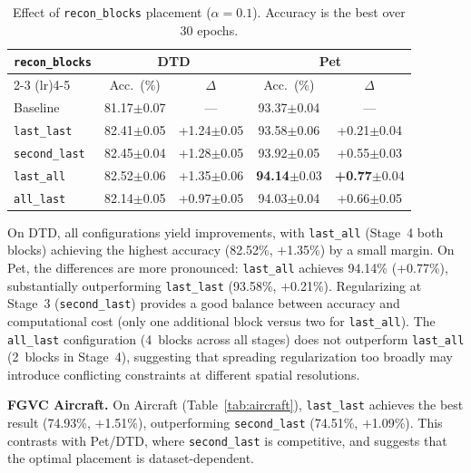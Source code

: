 \documentclass[review,12pt,authoryear]{elsarticle}
\newcommand{\std}[1]{{\scriptsize$\pm$#1}}
\begin{document}
\begin{table}[t]
\centering
\caption{Effect of \texttt{recon\_blocks} placement ($\alpha = 0.1$). Accuracy is the best over 30 epochs.}
\label{tab:blocks}
\small
\begin{tabular}{lcccc}
\toprule
\multirow{2}{*}{\texttt{recon\_blocks}} & \multicolumn{2}{c}{DTD} & \multicolumn{2}{c}{Pet} \\
\cmidrule(lr){2-3} \cmidrule(lr){4-5}
 & Acc.\ (\%) & $\Delta$ & Acc.\ (\%) & $\Delta$ \\
\midrule
Baseline       & 81.17\std{0.07} & ---   & 93.37\std{0.04} & ---   \\
\texttt{last\_last}    & 82.41\std{0.05} & +1.24\std{0.05} & 93.58\std{0.06} & +0.21\std{0.04} \\
\texttt{second\_last}  & 82.45\std{0.04} & +1.28\std{0.05} & 93.92\std{0.05} & +0.55\std{0.03} \\
\texttt{last\_all}     & 82.52\std{0.06} & +1.35\std{0.06} & \textbf{94.14}\std{0.03} & \textbf{+0.77}\std{0.04} \\
\texttt{all\_last}     & 82.14\std{0.05} & +0.97\std{0.05} & 94.03\std{0.04} & +0.66\std{0.05} \\
\bottomrule
\end{tabular}
\end{table}

On DTD, all configurations yield improvements, with \texttt{last\_all} (Stage~4 both blocks) achieving the highest accuracy (82.52\%, $+$1.35\%) by a small margin.
On Pet, the differences are more pronounced: \texttt{last\_all} achieves 94.14\% ($+$0.77\%), substantially outperforming \texttt{last\_last} (93.58\%, $+$0.21\%).
Regularizing at Stage~3 (\texttt{second\_last}) provides a good balance between accuracy and computational cost (only one additional block versus two for \texttt{last\_all}).
The \texttt{all\_last} configuration (4~blocks across all stages) does not outperform \texttt{last\_all} (2~blocks in Stage~4), suggesting that spreading regularization too broadly may introduce conflicting constraints at different spatial resolutions.

\textbf{FGVC Aircraft.}
On Aircraft (Table~\ref{tab:aircraft}), \texttt{last\_last} achieves the best result (74.93\%, $+$1.51\%), outperforming \texttt{second\_last} (74.51\%, $+$1.09\%).
This contrasts with Pet/DTD, where \texttt{second\_last} is competitive, and suggests that the optimal placement is dataset-dependent.
\end{document}
